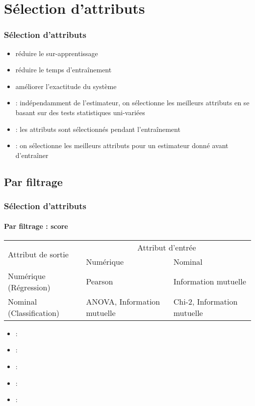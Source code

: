 \documentclass[xcolor=table]{beamer}
\begin{document}
\section{Sélection d'attributs}

\begin{frame}
	\frametitle{Sélection d'attributs}
	
	\begin{itemize}
		\item réduire le sur-apprentissage 
		\item réduire le temps d'entraînement
		\item améliorer l'exactitude du système
		\item {} : indépendamment de l'estimateur, on sélectionne les meilleurs attributs en se basant sur des tests statistiques uni-variées
		\item {} : les attributs sont sélectionnés pendant l'entraînement
		\item {} : on sélectionne les meilleurs attributs pour un estimateur donné avant d'entraîner
	\end{itemize}
	
\end{frame}

\subsection{Par filtrage}

\begin{frame}
	\frametitle{Sélection d'attributs}
	\framesubtitle{Par filtrage : score}
	
	\begin{tabular}{|p{}|p{}|p{}|}
	\hline
	\multirow{2}{*}{Attribut de sortie}	& \multicolumn{2}{c|}{Attribut d'entrée} \\
	\cline{2-3}
		& Numérique & Nominal \\
	\hline
	Numérique (Régression) & Pearson & Information mutuelle \\
	\hline
	Nominal (Classification) & ANOVA, Information mutuelle & Chi-2, Information mutuelle\\
	\hline
	\end{tabular}

	\begin{itemize}
		\item {} : 
		\item {} : 
		\item {} : 
		\item {} : 
		\item {} : 
	\end{itemize}
	
\end{frame}
\end{document}
